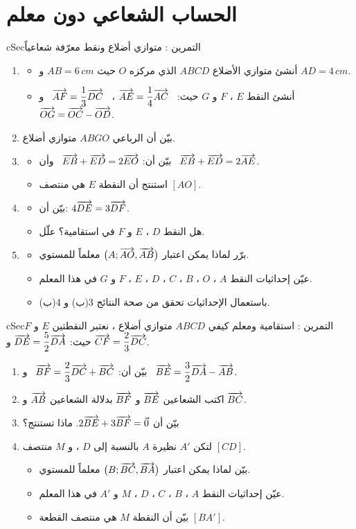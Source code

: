 \documentclass[12pt,a4paper]{article}
\newenvironment{BOX}[2]{\begin{otherlanguage}{english}\begin{arbox}{#1}{#2}}{\end{arbox}\end{otherlanguage}}
\newcounter{exo}
\newenvironment{tamrin}[1]{\stepcounter{exo}\begin{BOX}{cSec}{التمرين \theexo: #1}}{\end{BOX}}
\newenvironment{sq}{\begin{itemize}[leftmargin=2.4em,itemsep=3pt]}{\end{itemize}}
\newcommand{\qa}{\item[(أ)]}\newcommand{\qb}{\item[(ب)]}\newcommand{\qc}{\item[(جـ)]}\newcommand{\qd}{\item[(د)]}\newcommand{\qe}{\item[(هـ)]}
\begin{document}
\section{الحساب الشعاعي دون معلم}
\begin{tamrin}{متوازي أضلاع ونقط معرّفة شعاعياً}
\begin{enumerate}
\item
\begin{sq}
\qa أنشئ متوازي الأضلاع $ABCD$ الذي مركزه $O$ حيث $AB=6\,cm$ و $AD=4\,cm$.
\qb أنشئ النقط $E$ ، $F$ و $G$ حيث: \ $\V{AE}=\dfrac14\V{AC}$ ، \ $\V{AF}=\dfrac13\V{DC}$ \ و \ $\V{OG}=\V{OC}-\V{OD}$.
\end{sq}
\item بيّن أن الرباعي $ABGO$ متوازي أضلاع.
\item
\begin{sq}
\qa بيّن أن: $\V{EB}+\V{ED}=2\V{EO}$ \ وأن \ $\V{EB}+\V{ED}=2\V{AE}$.
\qb استنتج أن النقطة $E$ هي منتصف $[AO]$.
\end{sq}
\item
\begin{sq}
\qa بيّن أن: $4\V{DE}=3\V{DF}$.
\qb هل النقط $D$ ، $E$ و $F$ في استقامية؟ علّل.
\end{sq}
\item
\begin{sq}
\qa برّر لماذا يمكن اعتبار $\big(A;\V{AO},\V{AB}\big)$ معلماً للمستوي.
\qb عيّن إحداثيات النقط $A$ ، $O$ ، $B$ ، $C$ ، $D$ ، $E$ ، $F$ و $G$ في هذا المعلم.
\qc باستعمال الإحداثيات تحقق من صحة النتائج 3(ب) و 4(ب).
\end{sq}
\end{enumerate}
\end{tamrin}

\begin{tamrin}{استقامية ومعلم كيفي}
$ABCD$ متوازي أضلاع ، نعتبر النقطتين $E$ و $F$ حيث: $\V{DE}=\dfrac52\V{DA}$ و $\V{CF}=\dfrac23\V{DC}$.
\begin{enumerate}
\item بيّن أن: $\V{BF}=\dfrac23\V{DC}+\V{BC}$ \ و \ $\V{BE}=\dfrac32\V{DA}-\V{AB}$.
\item اكتب الشعاعين $\V{BE}$ و $\V{BF}$ بدلالة الشعاعين $\V{AB}$ و $\V{BC}$.
\item بيّن أن $2\V{BE}+3\V{BF}=\vec0$. ماذا تستنتج؟
\item لتكن $A'$ نظيرة $A$ بالنسبة إلى $D$ ، و $M$ منتصف $[CD]$.
\begin{sq}
\qa بيّن لماذا يمكن اعتبار $\big(B;\V{BC},\V{BA}\big)$ معلماً للمستوي.
\qb عيّن إحداثيات النقط $A$ ، $B$ ، $C$ ، $D$ ، $M$ و $A'$ في هذا المعلم.
\qc بيّن أن النقطة $M$ هي منتصف القطعة $[BA']$.
\end{sq}
\end{enumerate}
\end{tamrin}
\end{document}

